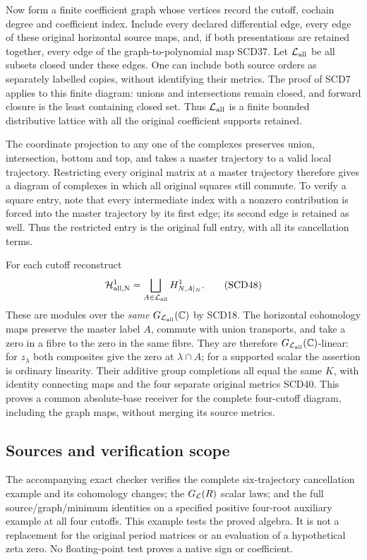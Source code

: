 \documentclass[11pt,a4paper]{article}
\theoremstyle{definition}\newtheorem{definition}[theorem]{Definition}
\newcommand{\C}{\mathbb C}\newcommand{\R}{\mathbb R}
\begin{document}
Now form a finite coefficient graph whose vertices record the cutoff,
cochain degree and coefficient index. Include every declared differential
edge, every edge of these original horizontal source maps, and, if both
presentations are retained together, every edge of the graph-to-polynomial
map SCD37. Let \(\mathcal L_{\rm all}\) be all subsets closed under these edges.
One can include both source orders as separately labelled copies, without
identifying their metrics. The proof of SCD7 applies to this finite
diagram: unions and intersections remain closed, and forward closure is
the least containing closed set. Thus \(\mathcal L_{\rm all}\) is a finite bounded
distributive lattice with all the original coefficient supports retained.

The coordinate projection to any one of the complexes preserves union,
intersection, bottom and top, and takes a master trajectory to a valid
local trajectory. Restricting every original matrix at a master trajectory
therefore gives a diagram of complexes in which all original squares
still commute. To verify a square entry, note that every intermediate
index with a nonzero contribution is forced into the master trajectory
by its first edge; its second edge is retained as well. Thus the restricted
entry is the original full entry, with all its cancellation terms.

For each cutoff reconstruct
\[
 \mathcal H_{\rm all,N}^1
 =\bigsqcup_{A\in\mathcal L_{\rm all}}H^1_{N,A|_N}.
 \tag{SCD48}
\]
These are modules over the \emph{same} \(G_{\LL_{\rm all}}(\C)\) by
SCD18. The horizontal cohomology maps preserve the master label \(A\),
commute with union transports, and take a zero in a fibre to the zero in
the same fibre. They are therefore \(G_{\LL_{\rm all}}(\C)\)-linear:
for \(z_\lambda\) both composites give the zero at \(\lambda\cap A\);
for a supported scalar the assertion is ordinary linearity.
Their additive group completions all equal the same \(K\), with identity
connecting maps and the four separate original metrics SCD40.
This proves a common absolute-base receiver for the complete four-cutoff
diagram, including the graph maps, without merging its source metrics.


\subsection{Sources and verification scope}

The accompanying exact checker verifies the complete six-trajectory
cancellation example and its cohomology changes; the \(G_{\mathcal L}(R)\)
scalar laws; and the full source/graph/minimum identities on a
specified positive four-root auxiliary example at all four cutoffs.
This example tests the proved algebra. It is not a replacement
for the original period matrices or an evaluation of a hypothetical
zeta zero. No floating-point test proves a native sign or coefficient.
\end{document}
